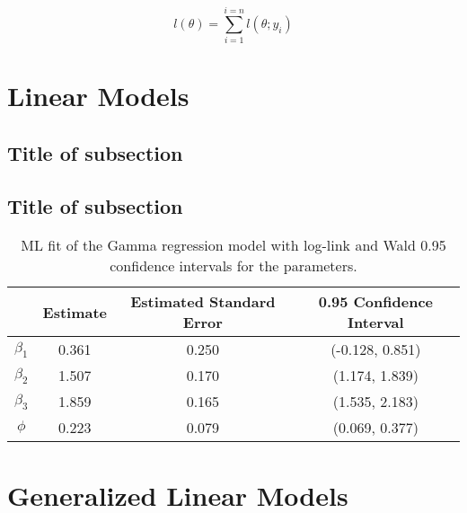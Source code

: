$$ l(\theta) = \sum_{i=1}^{i=n} l(\theta;y_i)$$







\section{Linear Models}
\noindent

\subsection{}
\noindent


\subsection{Title of subsection}
\noindent


\subsection{Title of subsection}
\noindent

\begin{table}[b]\centering\vspace{0.5cm}
	\caption{\label{tab:MLfit} ML fit of the Gamma regression model with log-link and Wald 0.95 confidence intervals for the parameters.}
	\medskip	
	\begin{tabular}{cccc}
		\toprule
		& Estimate & Estimated Standard Error & 0.95 Confidence Interval \\
		\midrule
		$\beta_1$ & 0.361 & 0.250 & (-0.128,  0.851) \\ 
		
		$\beta_2$ & 1.507 & 0.170 & (1.174, 1.839)\\
		
		$\beta_3$ & 1.859 & 0.165 & (1.535, 2.183)\\
		
		$\phi$ & 0.223 & 0.079 & (0.069, 0.377)\\
		\bottomrule
	\end{tabular}
\end{table}

\section{Generalized Linear Models}
\noindent

